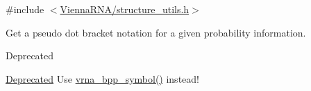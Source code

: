 {\ttfamily \#include $<$\hyperlink{structure__utils_8h}{Vienna\+R\+N\+A/structure\+\_\+utils.\+h}$>$}



Get a pseudo dot bracket notation for a given probability information. 

\begin{DoxyRefDesc}{Deprecated}
\item[\hyperlink{deprecated__deprecated000150}{Deprecated}]Use \hyperlink{group__struct__utils_ga025bff1b27fa46534c8fae6980f64bb5}{vrna\+\_\+bpp\+\_\+symbol()} instead! \end{DoxyRefDesc}
